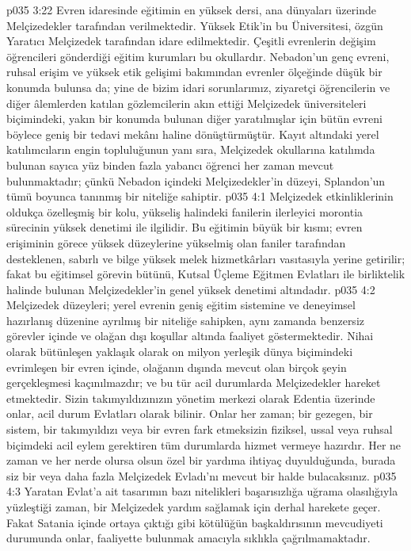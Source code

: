 \vs p035 3:22 Evren idaresinde eğitimin en yüksek dersi, ana dünyaları üzerinde Melçizedekler tarafından verilmektedir. Yüksek Etik’in bu Üniversitesi, özgün Yaratıcı Melçizedek tarafından idare edilmektedir. Çeşitli evrenlerin değişim öğrencileri gönderdiği eğitim kurumları bu okullardır. Nebadon’un genç evreni, ruhsal erişim ve yüksek etik gelişimi bakımından evrenler ölçeğinde düşük bir konumda bulunsa da; yine de bizim idari sorunlarımız, ziyaretçi öğrencilerin ve diğer âlemlerden katılan gözlemcilerin akın ettiği Melçizedek üniversiteleri biçimindeki, yakın bir konumda bulunan diğer yaratılmışlar için bütün evreni böylece geniş bir tedavi mekânı haline dönüştürmüştür. Kayıt altındaki yerel katılımcıların engin topluluğunun yanı sıra, Melçizedek okullarına katılımda bulunan sayıca yüz binden fazla yabancı öğrenci her zaman mevcut bulunmaktadır; çünkü Nebadon içindeki Melçizedekler’in düzeyi, Splandon’un tümü boyunca tanınmış bir niteliğe sahiptir.
\vs p035 4:1 Melçizedek etkinliklerinin oldukça özelleşmiş bir kolu, yükseliş halindeki fanilerin ilerleyici morontia sürecinin yüksek denetimi ile ilgilidir. Bu eğitimin büyük bir kısmı; evren erişiminin görece yüksek düzeylerine yükselmiş olan faniler tarafından desteklenen, sabırlı ve bilge yüksek melek hizmetkârları vasıtasıyla yerine getirilir; fakat bu eğitimsel görevin bütünü, Kutsal Üçleme Eğitmen Evlatları ile birliktelik halinde bulunan Melçizedekler’in genel yüksek denetimi altındadır.
\vs p035 4:2 Melçizedek düzeyleri; yerel evrenin geniş eğitim sistemine ve deneyimsel hazırlanış düzenine ayrılmış bir niteliğe sahipken, aynı zamanda benzersiz görevler içinde ve olağan dışı koşullar altında faaliyet göstermektedir. Nihai olarak bütünleşen yaklaşık olarak on milyon yerleşik dünya biçimindeki evrimleşen bir evren içinde, olağanın dışında mevcut olan birçok şeyin gerçekleşmesi kaçınılmazdır; ve bu tür acil durumlarda Melçizedekler hareket etmektedir. Sizin takımyıldızınızın yönetim merkezi olarak Edentia üzerinde onlar, acil durum Evlatları olarak bilinir. Onlar her zaman; bir gezegen, bir sistem, bir takımyıldızı veya bir evren fark etmeksizin fiziksel, ussal veya ruhsal biçimdeki acil eylem gerektiren tüm durumlarda hizmet vermeye hazırdır. Her ne zaman ve her nerde olursa olsun özel bir yardıma ihtiyaç duyulduğunda, burada siz bir veya daha fazla Melçizedek Evladı’nı mevcut bir halde bulacaksınız.
\vs p035 4:3 Yaratan Evlat’a ait tasarımın bazı nitelikleri başarısızlığa uğrama olasılığıyla yüzleştiği zaman, bir Melçizedek yardım sağlamak için derhal harekete geçer. Fakat Satania içinde ortaya çıktığı gibi kötülüğün başkaldırısının mevcudiyeti durumunda onlar, faaliyette bulunmak amacıyla sıklıkla çağrılmamaktadır.
